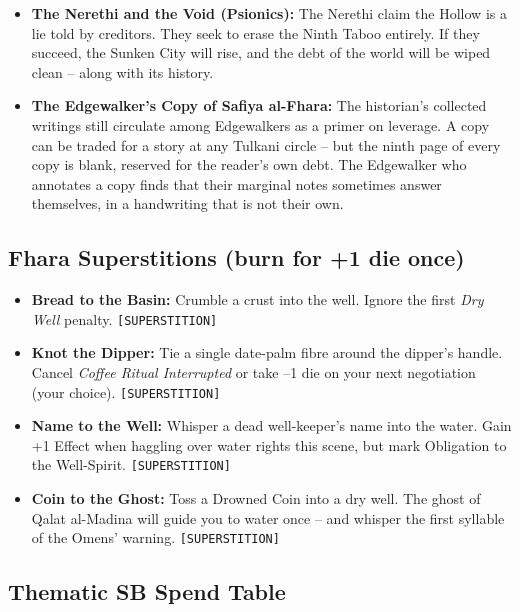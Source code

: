 \begin{itemize}
  \item \textbf{The Nerethi and the Void (Psionics):} The Nerethi claim the Hollow is a lie told by creditors. They seek to erase the Ninth Taboo entirely. If they succeed, the Sunken City will rise, and the debt of the world will be wiped clean -- along with its history.
  \item \textbf{The Edgewalker's Copy of Safiya al-Fhara:} The historian's collected writings still circulate among Edgewalkers as a primer on leverage. A copy can be traded for a story at any Tulkani circle -- but the ninth page of every copy is blank, reserved for the reader's own debt. The Edgewalker who annotates a copy finds that their marginal notes sometimes answer themselves, in a handwriting that is not their own.
\end{itemize}

\subsection*{Fhara Superstitions (burn for +1 die once)}
\begin{itemize}
  \item \textbf{Bread to the Basin:} Crumble a crust into the well. Ignore the first \emph{Dry Well} penalty. \texttt{[SUPERSTITION]}
  \item \textbf{Knot the Dipper:} Tie a single date-palm fibre around the dipper's handle. Cancel \emph{Coffee Ritual Interrupted} or take --1 die on your next negotiation (your choice). \texttt{[SUPERSTITION]}
  \item \textbf{Name to the Well:} Whisper a dead well-keeper's name into the water. Gain +1 Effect when haggling over water rights this scene, but mark Obligation to the Well-Spirit. \texttt{[SUPERSTITION]}
  \item \textbf{Coin to the Ghost:} Toss a Drowned Coin into a dry well. The ghost of Qalat al-Madina will guide you to water once -- and whisper the first syllable of the Omens' warning. \texttt{[SUPERSTITION]}
\end{itemize}

\subsection*{Thematic SB Spend Table}
\label{sec:fhara-sb}

